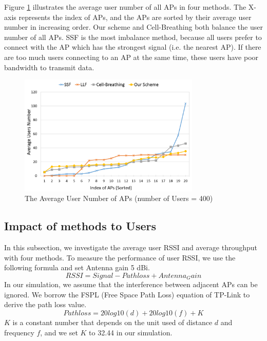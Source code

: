 Figure \ref{fig:Average-user-number} illustrates the average user number of all APs in four methods. The X-axis represents the index of APs, and the APs are sorted by their average user number in increasing order. Our scheme and Cell-Breathing both balance the user number of all APs. SSF is the most imbalance method, because all users prefer to connect with the AP which has the strongest signal (i.e. the nearest AP). If there are too much users connecting to an AP at the same time, these users have poor bandwidth to transmit data.

\begin{figure}[tbp]
\begin{center}
\includegraphics[width=3.4in]{images/Average_user_number.png}
\end{center}
\caption{The Average User Number of APs (number of Users = 400)}
\label{fig:Average-user-number}
\end{figure}

\subsection{Impact of methods to Users}
In this subsection, we investigate the average user RSSI and average throughput with four methods. To measure the performance of user RSSI, we use the following formula and set Antenna gain 5 dBi.
\begin{equation}\label{RSSI}
  RSSI= Signal - Pathloss + Antenna_Gain
\end{equation}
In our simulation, we assume that the interference between adjacent APs can be ignored. We borrow the FSPL (Free Space Path Loss) equation of TP-Link to derive the path loss value.
\begin{equation}\label{Pathloss}
  Pathloss = 20log10(d)+ 20log10(f) + K
\end{equation}
$K$ is a constant number that depends on the unit used of distance $d$ and frequency $f$, and we set $K$ to 32.44 in our simulation.


